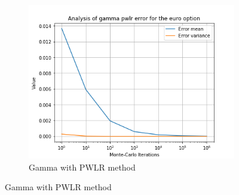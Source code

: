 \documentclass[11pt,a4paper,fleqn,draft]{article}
\begin{document}
\begin{figure}
\begin{subfigure}[b]{0.3\textwidth}
          \includegraphics[width=\textwidth]{graphs/eurogammapwlr.png}
          \caption{Gamma with PWLR method}
      \end{subfigure}


\end{figure}
\end{document}
